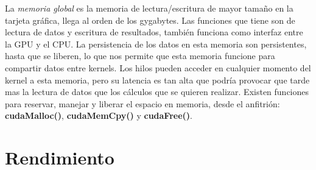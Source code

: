 La \textit{memoria global} es la memoria de lectura/escritura de mayor tamaño en la tarjeta gráfica, llega al orden de los gygabytes. Las funciones que tiene son de lectura de datos y escritura de resultados, también funciona como interfaz entre la GPU y el CPU. La persistencia de los datos en esta memoria son persistentes, hasta que se liberen, lo que nos permite que esta memoria funcione para compartir datos entre kernels. Los hilos pueden acceder en cualquier momento del kernel a esta memoria, pero su latencia es tan alta que podría provocar que tarde mas la lectura de datos que los cálculos que se quieren realizar. Existen funciones para reservar, manejar y liberar el espacio en memoria, desde el anfitrión: \textbf{cudaMalloc()}, \textbf{cudaMemCpy()} y \textbf{cudaFree()}.







\section{Rendimiento}

